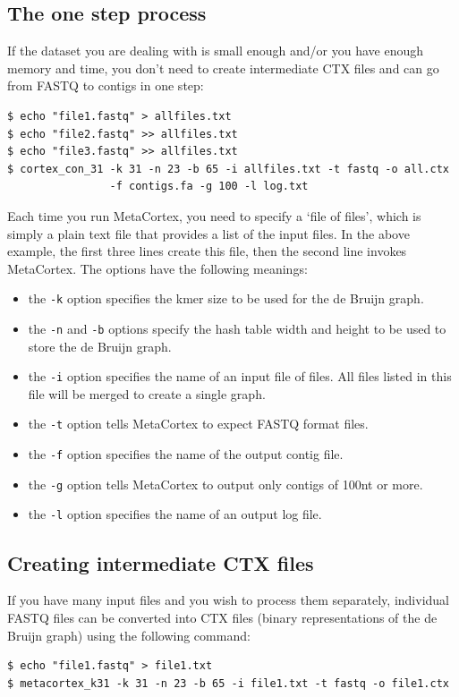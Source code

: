 \documentclass[a4paper,11pt,oneside]{article}
\begin{document}
\subsection{The one step process}

If the dataset you are dealing with is small enough and/or you have enough memory and time, you don't need to create intermediate CTX files and can go from FASTQ to contigs in one step:
\vspace{6pt}
\begin{verbatim}
$ echo "file1.fastq" > allfiles.txt
$ echo "file2.fastq" >> allfiles.txt
$ echo "file3.fastq" >> allfiles.txt
$ cortex_con_31 -k 31 -n 23 -b 65 -i allfiles.txt -t fastq -o all.ctx
                -f contigs.fa -g 100 -l log.txt
\end{verbatim}

\noindent Each time you run MetaCortex, you need to specify a `file of files', which is simply a plain text file that provides a list of the input files. In the above example, the first three lines create this file, then the second line invokes MetaCortex. The options have the following meanings:
\begin{itemize}
\item{the \verb=-k= option specifies the kmer size to be used for the de Bruijn graph.}
\item{the \verb=-n= and \verb=-b= options specify the hash table width and height to be used to store the de Bruijn graph.}
\item{the \verb=-i= option specifies the name of an input file of files. All files listed in this file will be merged to create a single graph.}
\item{the \verb=-t= option tells MetaCortex to expect FASTQ format files.}
\item{the \verb=-f= option specifies the name of the output contig file.}
\item{the \verb=-g= option tells MetaCortex to output only contigs of 100nt or more.}
\item{the \verb=-l= option specifies the name of an output log file.}
\end{itemize}

\subsection{Creating intermediate CTX files}

If you have many input files and you wish to process them separately, individual FASTQ files can be converted into CTX files (binary representations of the de Bruijn graph) using the following command:
\vspace{6pt}
\begin{verbatim}
$ echo "file1.fastq" > file1.txt
$ metacortex_k31 -k 31 -n 23 -b 65 -i file1.txt -t fastq -o file1.ctx
\end{verbatim}
\vspace{6pt}
\end{document}
